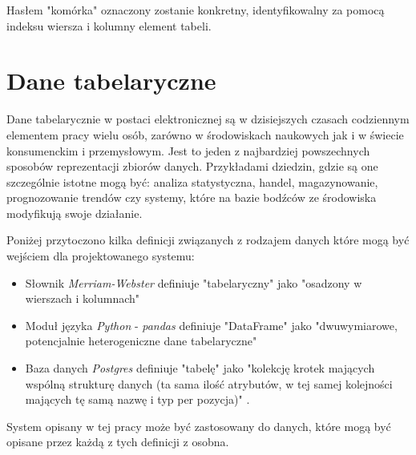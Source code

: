 \documentclass[brudnopis]{xmgr}
\begin{document}
Hasłem "komórka" oznaczony zostanie konkretny, identyfikowalny za pomocą indeksu wiersza i kolumny element tabeli.

\chapter{Dane tabelaryczne}

Dane tabelarycznie w postaci elektronicznej są w dzisiejszych czasach codziennym elementem pracy wielu osób, zarówno w środowiskach naukowych jak i w świecie konsumenckim i przemysłowym. Jest to jeden z najbardziej powszechnych sposobów reprezentacji zbiorów danych. Przykładami dziedzin, gdzie są one szczególnie istotne mogą być: analiza statystyczna, handel, magazynowanie, prognozowanie trendów czy systemy, które na bazie bodźców ze środowiska modyfikują swoje działanie.
\medskip

Poniżej przytoczono kilka definicji związanych z rodzajem danych które mogą być wejściem dla projektowanego systemu:

\begin{itemize}
    \item Słownik \emph{Merriam-Webster} definiuje "tabelaryczny" jako "osadzony w wierszach i kolumnach" \cite{MW:TAB}
    \item Moduł języka \emph{Python} - \emph{pandas} definiuje "DataFrame" jako "dwuwymiarowe, potencjalnie heterogeniczne dane tabelaryczne" \cite{P:DF}
    \item Baza danych \emph{Postgres} definiuje "tabelę" jako "kolekcję krotek mających wspólną strukturę danych (ta sama ilość atrybutów, w tej samej kolejności mających tę samą nazwę i typ per pozycja)" \cite{PSQL:TAB}.
\end{itemize}
\medskip




System opisany w tej pracy może być zastosowany do danych, które mogą być opisane przez każdą z tych definicji z osobna.
\end{document}
